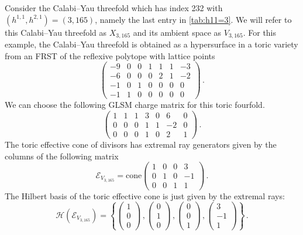 \documentclass[11pt,dvipsnames]{article}
\theoremstyle{definition}
\begin{document}
Consider the Calabi--Yau threefold which has index 232 with $(h^{1,1},h^{2,1})=(3,165)$, namely the last entry in \cref{tab:h11=3}. We will refer to this Calabi--Yau threefold as $X_{3,165}$ and its ambient space as $V_{3,165}$. For this example, the Calabi--Yau threefold is obtained as a hypersurface in a toric variety from an FRST of the reflexive polytope with lattice points
\begin{equation}
    \begin{pmatrix}
        -9&0&0&1&1&1&-3\\
        -6&0&0&0&2&1&-2\\
        -1&0&1&0&0&0&0\\
        -1&1&0&0&0&0&0
    \end{pmatrix}\,.
\end{equation}
We can choose the following GLSM charge matrix for this toric fourfold.
\begin{equation}
    \begin{pmatrix}
        \label{eq:GLSM_3_165}
        1&1&1&3&0&6&0\\
        0&0&0&1&1&-2&0\\
        0&0&0&1&0&2&1
    \end{pmatrix}\,.
\end{equation}
The toric effective cone of divisors has extremal ray generators given by the columns of the following matrix
\begin{equation}
    \mathcal{E}_{V_{3,165}} = \mathrm{cone}
    \begin{pmatrix}
        1&0&0&3\\
        0&1&0&-1\\
        0&0&1&1
    \end{pmatrix}\,.
\end{equation}
The Hilbert basis of the toric effective cone is just given by the extremal rays:
\begin{equation}
    \mathcal{H}(\mathcal{E}_{V_{3,165}})=\left\{
    \begin{pmatrix}
        1\\
        0\\
        0
    \end{pmatrix}\,,
    \begin{pmatrix}
        0\\
        1\\
        0
    \end{pmatrix}\,,
    \begin{pmatrix}
        0\\
        0\\
        1
    \end{pmatrix}\,,
    \begin{pmatrix}
        3\\
        -1\\
        1
    \end{pmatrix}
    \right\}\,.
\end{equation}
\end{document}
